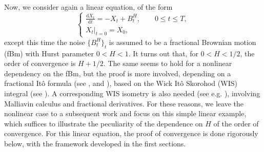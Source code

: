 \documentclass[reqno,12pt]{amsart}
\theoremstyle{plain} %
\theoremstyle{definition} %
\begin{document}
Now, we consider again a linear equation, of the form
\begin{equation}
    \label{linearnonhomogeneousfbm}
    \begin{cases}
        \displaystyle \frac{\mathrm{d}X_t}{\mathrm{d} t} = -X_t + B^H_t, \qquad 0 \leq t \leq T, \\
        \left. X_t \right|_{t = 0} = X_0,
      \end{cases}
\end{equation}
except this time the noise $\{B^H_t\}_t$ is assumed to be a fractional Brownian motion (fBm) with Hurst parameter $0 < H < 1$. It turns out that, for $0 < H < 1/2$, the order of convergence is $H + 1/2$. The same seems to hold for a nonlinear dependency on the fBm, but the proof is more involved, depending on a fractional It\^o formula (see \cite[Theorem 4.2.6]{BHOB2008}, \cite[Theorem 4.1]{Bender2003}and \cite[Theorem 2.7.4]{Mishura2008}), based on the Wick It\^o Skorohod (WIS) integral (see \cite[Chapter 4]{BHOB2008}). A corresponding WIS isometry is also needed (see e.g. \cite[Theorem 4.5.6]{BHOB2008}), involving Malliavin calculus and fractional derivatives. For these reasons, we leave the nonlinear case to a subsequent work and focus on this simple linear example, which suffices to illustrate the peculiarity of the dependence on $H$ of the order of convergence. For this linear equation, the proof of convergence is done rigorously below, with the framework developed in the first sections.
\end{document}
